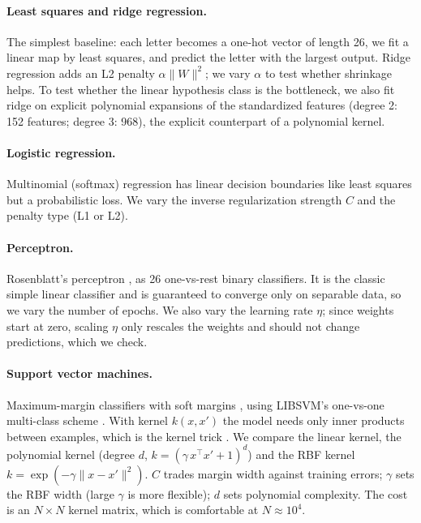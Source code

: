 \documentclass{article}
\begin{document}
\paragraph{Least squares and ridge regression.} The simplest baseline: each letter becomes a one-hot vector of length 26, we fit a linear map by least squares, and predict the letter with the largest output. Ridge regression \citep{hoerl1970ridge} adds an L2 penalty $\alpha\lVert W\rVert^2$; we vary $\alpha$ to test whether shrinkage helps. To test whether the linear hypothesis class is the bottleneck, we also fit ridge on explicit polynomial expansions of the standardized features (degree 2: 152 features; degree 3: 968), the explicit counterpart of a polynomial kernel.

\paragraph{Logistic regression.} Multinomial (softmax) regression has linear decision boundaries like least squares but a probabilistic loss. We vary the inverse regularization strength $C$ and the penalty type (L1 or L2).

\paragraph{Perceptron.} Rosenblatt's perceptron \citep{rosenblatt1958perceptron}, as 26 one-vs-rest binary classifiers. It is the classic simple linear classifier and is guaranteed to converge only on separable data, so we vary the number of epochs. We also vary the learning rate $\eta$; since weights start at zero, scaling $\eta$ only rescales the weights and should not change predictions, which we check.

\paragraph{Support vector machines.} Maximum-margin classifiers with soft margins \citep{cortes1995support}, using LIBSVM's one-vs-one multi-class scheme \citep{chang2011libsvm}. With kernel $k(x,x')$ the model needs only inner products between examples, which is the kernel trick \citep{boser1992training}. We compare the linear kernel, the polynomial kernel (degree $d$, $k=(\gamma\, x^\top x'+1)^d$) and the RBF kernel $k=\exp(-\gamma\lVert x-x'\rVert^2)$. $C$ trades margin width against training errors; $\gamma$ sets the RBF width (large $\gamma$ is more flexible); $d$ sets polynomial complexity. The cost is an $N\times N$ kernel matrix, which is comfortable at $N\approx 10^4$.
\end{document}
